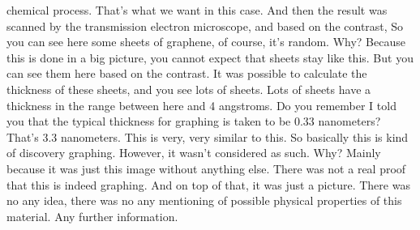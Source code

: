 chemical process. That's what we want in this case. And then the result was scanned by the transmission electron microscope, and based on the contrast, So you can see here some sheets of graphene, of course, it's random. Why? Because this is done in a big picture, you cannot expect that sheets stay like this. But you can see them here based on the contrast. It was possible to calculate the thickness of these sheets, and you see lots of sheets. Lots of sheets have a thickness in the range between here and 4 angstroms. Do you remember I told you that the typical thickness for graphing is taken to be 0.33 nanometers? That's 3.3 nanometers. This is very, very similar to this. So basically this is kind of discovery graphing. However, it wasn't considered as such. Why? Mainly because it was just this image without anything else. There was not a real proof that this is indeed graphing. And on top of that, it was just a picture. There was no any idea, there was no any mentioning of possible physical properties of this material. Any further information.
